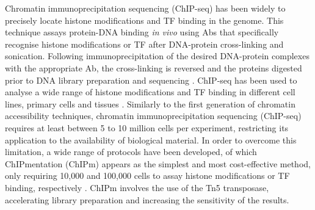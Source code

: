 Chromatin immunoprecipitation sequencing (ChIP-seq) has been widely to precisely locate histone modifications and TF binding in the genome. This technique assays protein-DNA binding \textit{in vivo} using Abs that specifically recognise histone modifications or TF after DNA-protein cross-linking and sonication. Following immunoprecipitation of the desired DNA-protein complexes with the appropriate Ab, the cross-linking is reversed and the proteins digested prior to DNA library preparation and sequencing \parencite{Solomon1988,Barski2007,Johnson2007}. ChIP-seq has been used to analyse a wide range of histone modifications and TF binding in different cell lines, primary cells and tissues \parencite{ENCODE2012,Bernstein2010,Adams2012}. Similarly to the first generation of chromatin accessibility techniques, chromatin immunoprecipitation sequencing (ChIP-seq) requires at least between 5 to 10 million cells per experiment, restricting its application to the availability of biological material. In order to overcome this limitation, a wide range of protocols have been developed, of which ChIPmentation (ChIPm) appears as the simplest and most cost-effective method, only requiring 10,000 and 100,000 cells to assay histone modifications or TF binding, respectively \parencite{Schmidl2016}. ChIPm involves the use of the Tn5 transposase, accelerating library preparation and increasing the sensitivity of the results. 


